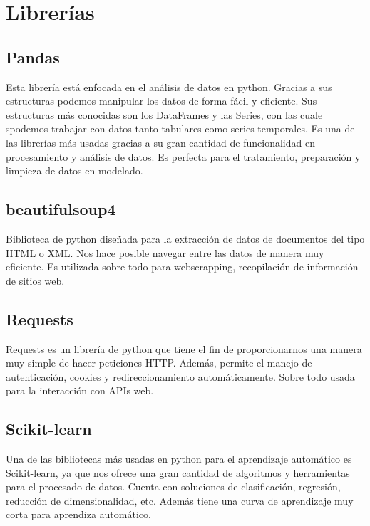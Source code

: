 \section{Librerías}

\subsection{Pandas}
Esta librería está enfocada en el análisis de datos en python. Gracias a sus estructuras podemos manipular los datos de forma fácil y eficiente. Sus estructuras más conocidas son los DataFrames y las Series, con las cuale spodemos trabajar con datos tanto tabulares como series temporales. Es una de las librerías más usadas gracias a su gran cantidad de funcionalidad en procesamiento y análisis de datos. Es perfecta para el tratamiento, preparación y limpieza de datos en modelado.

\subsection{beautifulsoup4}
Biblioteca de python diseñada para la extracción de datos de documentos del tipo HTML o XML. Nos hace posible navegar entre las datos de manera muy eficiente. Es utilizada sobre todo para webscrapping, recopilación de información de sitios web. 

\subsection{Requests}
Requests es un librería de python que tiene el fin de proporcionarnos una manera muy simple de hacer peticiones HTTP. Además, permite el manejo de autenticación, cookies y redireccionamiento automáticamente. Sobre todo usada para la interacción con APIs web.

\subsection{Scikit-learn}
Una de las bibliotecas más usadas en python para el aprendizaje automático es Scikit-learn, ya que nos ofrece una gran cantidad de algoritmos y herramientas para el procesado de datos. Cuenta con soluciones de clasificación, regresión, reducción de dimensionalidad, etc. Además tiene una curva de aprendizaje muy corta para aprendiza automático.
